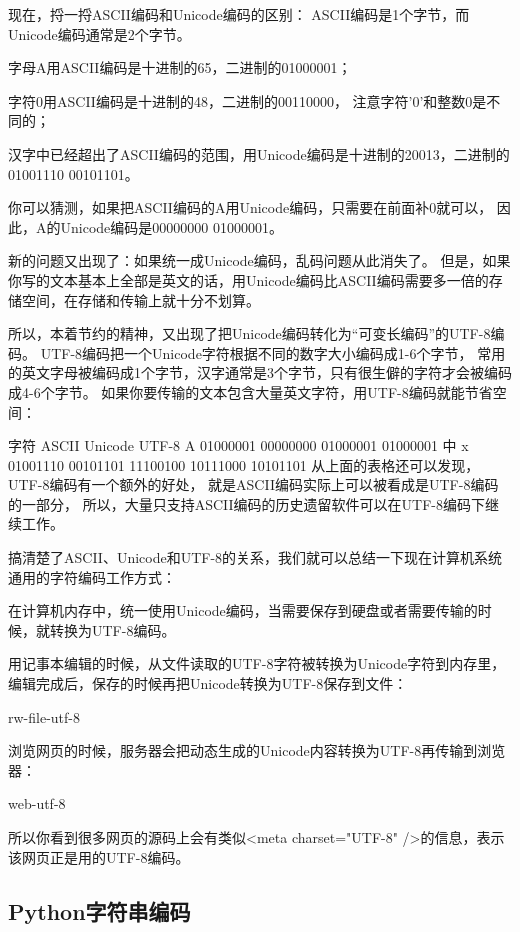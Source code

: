 现在，捋一捋ASCII编码和Unicode编码的区别：
ASCII编码是1个字节，而Unicode编码通常是2个字节。

字母A用ASCII编码是十进制的65，二进制的01000001；

字符0用ASCII编码是十进制的48，二进制的00110000，
注意字符'0'和整数0是不同的；

汉字中已经超出了ASCII编码的范围，用Unicode编码是十进制的20013，二进制的01001110 00101101。

你可以猜测，如果把ASCII编码的A用Unicode编码，只需要在前面补0就可以，
因此，A的Unicode编码是00000000 01000001。

新的问题又出现了：如果统一成Unicode编码，乱码问题从此消失了。
但是，如果你写的文本基本上全部是英文的话，用Unicode编码比ASCII编码需要多一倍的存储空间，在存储和传输上就十分不划算。

所以，本着节约的精神，又出现了把Unicode编码转化为“可变长编码”的UTF-8编码。
UTF-8编码把一个Unicode字符根据不同的数字大小编码成1-6个字节，
常用的英文字母被编码成1个字节，汉字通常是3个字节，只有很生僻的字符才会被编码成4-6个字节。
如果你要传输的文本包含大量英文字符，用UTF-8编码就能节省空间：

字符	ASCII	Unicode	UTF-8
A	01000001	00000000 01000001	01000001
中	x	01001110 00101101	11100100 10111000 10101101
从上面的表格还可以发现，UTF-8编码有一个额外的好处，
就是ASCII编码实际上可以被看成是UTF-8编码的一部分，
所以，大量只支持ASCII编码的历史遗留软件可以在UTF-8编码下继续工作。

搞清楚了ASCII、Unicode和UTF-8的关系，我们就可以总结一下现在计算机系统通用的字符编码工作方式：

在计算机内存中，统一使用Unicode编码，当需要保存到硬盘或者需要传输的时候，就转换为UTF-8编码。

用记事本编辑的时候，从文件读取的UTF-8字符被转换为Unicode字符到内存里，
编辑完成后，保存的时候再把Unicode转换为UTF-8保存到文件：

rw-file-utf-8

浏览网页的时候，服务器会把动态生成的Unicode内容转换为UTF-8再传输到浏览器：

web-utf-8

所以你看到很多网页的源码上会有类似<meta charset="UTF-8" />的信息，表示该网页正是用的UTF-8编码。

\subsection{Python字符串编码}


